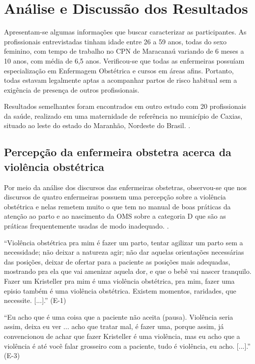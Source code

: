 \chapter{Análise e Discussão dos Resultados}
\label{chap:resultados}

Apresentam-se algumas informações que buscar caracterizar as participantes. As profissionais entrevistadas tinham idade entre 26 a 59 anos, todas do sexo feminino, com tempo de trabalho no CPN de Maracanaú variando de 6 meses a 10 anos, com média de 6,5 anos. Verificou-se que todas as enfermeiras possuíam especialização em Enfermagem Obstétrica e cursos em áreas afins. Portanto, todas estavam legalmente aptas a acompanhar partos de risco habitual sem a exigência de presença de outros profissionais.

Resultados semelhantes foram encontrados em outro estudo com 20 profissionais da saúde, realizado em uma maternidade de referência no município de Caxias, situado ao leste do estado do Maranhão, Nordeste do Brasil. \cite{cardoso2017violencia}.

\section{Percepção da enfermeira obstetra acerca da violência obstétrica}

Por meio da análise dos discursos das enfermeiras obstetras, observou-se que nos discursos de quatro enfermeiras possuem uma percepção sobre a violência obstétrica e nelas remetem muito o que tem no manual de boas práticas da atenção ao parto e ao nascimento da OMS sobre a categoria D que são as práticas frequentemente usadas de modo inadequado. \cite{world1996world}.

\begin{citacao}
``Violência obstétrica pra mim é fazer um parto, tentar agilizar um parto sem a necessidade; não deixar a natureza agir; não dar aquelas orientações necessárias das posições, deixar de ofertar para a paciente as posições mais adequadas, mostrando pra ela que vai amenizar aquela dor, e que o bebê vai nascer tranquilo. Fazer um Kristeller pra mim é uma violência obstétrica, pra mim, fazer uma episio também é uma violência obstétrica. Existem momentos, raridades, que necessite. [...].'' (E-1)
\end{citacao}

\begin{citacao}
``Eu acho que é uma coisa que a paciente não aceita (pausa). Violência seria assim, deixa eu ver ... acho que tratar mal, é fazer uma, porque assim, já convencionou de achar que fazer Kristeller é uma violência, mas eu acho que a violência é até você falar grosseiro com a paciente, tudo é violência, eu acho. [...].'' (E-3)
\end{citacao}

